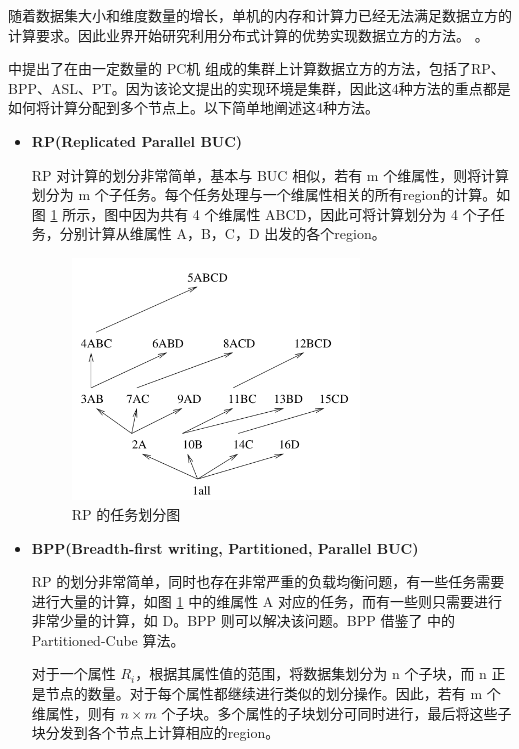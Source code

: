 随着数据集大小和维度数量的增长，单机的内存和计算力已经无法满足数据立方的计算要求。因此业界开始研究利用分布式计算的优势实现数据立方的方法。\cite{nandi2011distributed} \cite{dehne2006cgmcube} \cite{ng2001iceberg} \cite{lee2012efficient}。

\cite{ng2001iceberg} 中提出了在由一定数量的 PC机 组成的集群上计算数据立方的方法，包括了RP、BPP、ASL、PT。因为该论文提出的实现环境是集群，因此这4种方法的重点都是如何将计算分配到多个节点上。以下简单地阐述这4种方法。

\begin{itemize}

\item \textbf{RP(Replicated Parallel BUC)}

RP 对计算的划分非常简单，基本与 BUC 相似，若有 m 个维属性，则将计算划分为 m 个子任务。每个任务处理与一个维属性相关的所有region的计算。如图 \ref{cluster_rp} 所示，图中因为共有 4 个维属性 ABCD，因此可将计算划分为 4 个子任务，分别计算从维属性 A，B，C，D 出发的各个region。

\begin{figure}[!htb]
\centering\includegraphics[width=3in]{picture/ch_current_research/cluster_rp} 
\caption{RP 的任务划分图}\label{cluster_rp} 
\end{figure} 

\item \textbf{BPP(Breadth-first writing, Partitioned, Parallel BUC)}

RP 的划分非常简单，同时也存在非常严重的负载均衡问题，有一些任务需要进行大量的计算，如图 \ref{cluster_rp} 中的维属性 A 对应的任务，而有一些则只需要进行非常少量的计算，如 D。BPP 则可以解决该问题。BPP 借鉴了 \cite{ross1997fast} 中的 Partitioned-Cube 算法。

对于一个属性 ${R}_{i}$，根据其属性值的范围，将数据集划分为 n 个子块，而 n 正是节点的数量。对于每个属性都继续进行类似的划分操作。因此，若有 m 个维属性，则有 $n \times m$ 个子块。多个属性的子块划分可同时进行，最后将这些子块分发到各个节点上计算相应的region。


\end{itemize}
